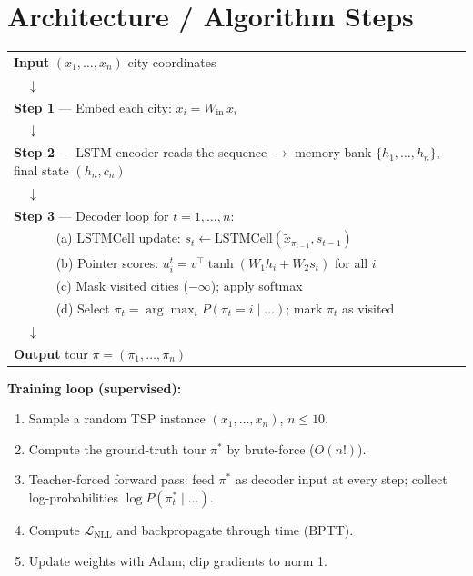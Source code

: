 \documentclass[12pt,a4paper]{article}
\begin{document}
\section{Architecture / Algorithm Steps}

\begin{center}
\begin{tabularx}{\linewidth}{X}
\textbf{Input} $(x_1, \dots, x_n)$ city coordinates\\
$\quad\downarrow$\\
\textbf{Step 1} --- Embed each city: $\tilde{x}_i = W_{\mathrm{in}}\,x_i$\\
$\quad\downarrow$\\
\textbf{Step 2} --- LSTM encoder reads the sequence
$\to$ memory bank $\{h_1, \dots, h_n\}$, final state $(h_n, c_n)$\\
$\quad\downarrow$\\
\textbf{Step 3} --- Decoder loop for $t = 1, \dots, n$:\\
$\quad\quad\quad$ (a) LSTMCell update: $s_t \leftarrow \mathrm{LSTMCell}(\tilde{x}_{\pi_{t-1}}, s_{t-1})$\\
$\quad\quad\quad$ (b) Pointer scores: $u_i^t = v^\top \tanh(W_1 h_i + W_2 s_t)$ for all $i$\\
$\quad\quad\quad$ (c) Mask visited cities ($-\infty$); apply softmax\\
$\quad\quad\quad$ (d) Select $\pi_t = \arg\max_i P(\pi_t = i \mid \ldots)$; mark $\pi_t$ as visited\\
$\quad\downarrow$\\
\textbf{Output} tour $\pi = (\pi_1, \dots, \pi_n)$\\
\end{tabularx}
\end{center}

\textbf{Training loop (supervised):}
\begin{enumerate}[leftmargin=2em]
  \item Sample a random TSP instance $(x_1, \dots, x_n)$, $n \leq 10$.
  \item Compute the ground-truth tour $\pi^*$ by brute-force ($O(n!)$).
  \item Teacher-forced forward pass: feed $\pi^*$ as decoder input at every
    step; collect log-probabilities $\log P(\pi_t^* \mid \ldots)$.
  \item Compute $\mathcal{L}_{\mathrm{NLL}}$ and backpropagate through time
    (BPTT).
  \item Update weights with Adam; clip gradients to norm 1.
\end{enumerate}
\end{document}
